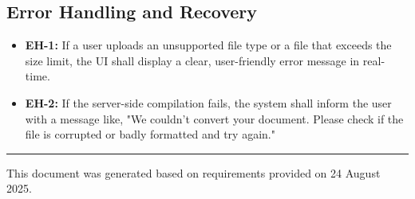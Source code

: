 \documentclass[a4paper, 11pt]{article}
\begin{document}
\subsection{Error Handling and Recovery}
\begin{itemize}
    \item[{\color{AUCDTBurgundy}\faExclamationCircle}] \textbf{EH-1:} If a user uploads an unsupported file type or a file that exceeds the size limit, the UI shall display a clear, user-friendly error message in real-time.
    \item[{\color{AUCDTBurgundy}\faExclamationCircle}] \textbf{EH-2:} If the server-side compilation fails, the system shall inform the user with a message like, "We couldn't convert your document. Please check if the file is corrupted or badly formatted and try again."
\end{itemize}


\vfill
\hrule
\vspace{2mm}
\begin{center}
    \poppinslight
    This document was generated based on requirements provided on 24 August 2025.
\end{center}
\end{document}
